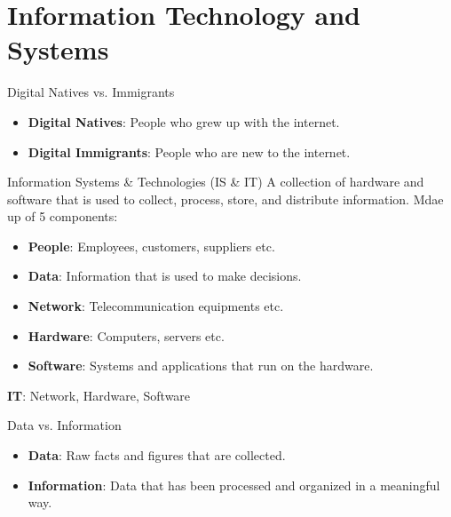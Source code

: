 \documentclass{article}
\begin{document}



\newpage
\tableofcontents
\newpage


\section{Information Technology and Systems}

\begin{definition}
    {Digital Natives vs. Immigrants}
    \begin{itemize}
        \item \textbf{Digital Natives}: People who grew up with the internet.
        \item \textbf{Digital Immigrants}: People who are new to the internet.
    \end{itemize}
\end{definition}

\begin{definition}
    {Information Systems \& Technologies (IS \& IT)}
    A collection of hardware and software that is used to collect, process, store, and distribute information.
    Mdae up of 5 components:
    \begin{itemize}
        \item \textbf{People}: Employees, customers, suppliers etc.
        \item \textbf{Data}: Information that is used to make decisions.
        \item \textbf{Network}: Telecommunication equipments etc.
        \item \textbf{Hardware}: Computers, servers etc.
        \item \textbf{Software}: Systems and applications that run on the hardware.
    \end{itemize}
    \textbf{IT}: Network, Hardware, Software
\end{definition}

\begin{definition}
    {Data vs. Information}
    \begin{itemize}
        \item \textbf{Data}: Raw facts and figures that are collected.
        \item \textbf{Information}: Data that has been processed and organized in a meaningful way.
    \end{itemize}
\end{definition}
\end{document}
